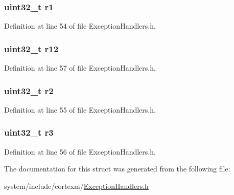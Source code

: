 \subsubsection[{\texorpdfstring{r1}{r1}}]{\setlength{\rightskip}{0pt plus 5cm}uint32\+\_\+t r1}\hypertarget{struct_exception_stack_frame_a241f774bd9124717ac8d6cfa094a6d1b}{}\label{struct_exception_stack_frame_a241f774bd9124717ac8d6cfa094a6d1b}


Definition at line 54 of file Exception\+Handlers.\+h.

\subsubsection[{\texorpdfstring{r12}{r12}}]{\setlength{\rightskip}{0pt plus 5cm}uint32\+\_\+t r12}\hypertarget{struct_exception_stack_frame_aa36a3c046c2e3b281b4cd7b3f52a044a}{}\label{struct_exception_stack_frame_aa36a3c046c2e3b281b4cd7b3f52a044a}


Definition at line 57 of file Exception\+Handlers.\+h.

\subsubsection[{\texorpdfstring{r2}{r2}}]{\setlength{\rightskip}{0pt plus 5cm}uint32\+\_\+t r2}\hypertarget{struct_exception_stack_frame_a3f3de83e4d1261e394f4547c8ec0198f}{}\label{struct_exception_stack_frame_a3f3de83e4d1261e394f4547c8ec0198f}


Definition at line 55 of file Exception\+Handlers.\+h.

\subsubsection[{\texorpdfstring{r3}{r3}}]{\setlength{\rightskip}{0pt plus 5cm}uint32\+\_\+t r3}\hypertarget{struct_exception_stack_frame_ad4e4edcda33d8d8453c34e205f3836ac}{}\label{struct_exception_stack_frame_ad4e4edcda33d8d8453c34e205f3836ac}


Definition at line 56 of file Exception\+Handlers.\+h.



The documentation for this struct was generated from the following file\+:\begin{DoxyCompactItemize}
\item 
system/include/cortexm/\hyperlink{_exception_handlers_8h}{Exception\+Handlers.\+h}\end{DoxyCompactItemize}
